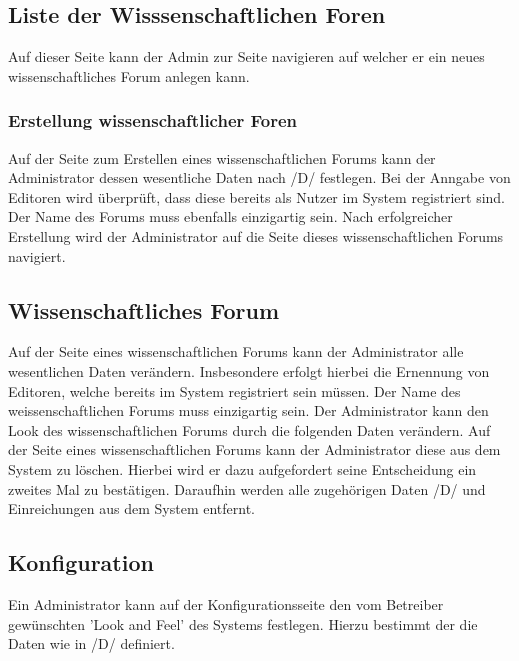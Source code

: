 \subsection{Liste der Wisssenschaftlichen Foren}
\begin{description}
     Auf dieser Seite kann der Admin zur Seite navigieren auf welcher er ein neues
    wissenschaftliches Forum anlegen kann. %
\end{description}

\subsubsection{Erstellung wissenschaftlicher Foren}
\begin{description}
     Auf der Seite zum Erstellen eines wissenschaftlichen Forums kann der Administrator dessen
    wesentliche Daten nach /D/ %
    festlegen. Bei der Anngabe von Editoren wird überprüft, dass diese bereits als Nutzer im System registriert sind.
    Der Name des Forums muss ebenfalls einzigartig sein.
    Nach erfolgreicher Erstellung wird der Administrator auf die Seite dieses wissenschaftlichen Forums
    navigiert.
\end{description}

\subsection{Wissenschaftliches Forum}
\begin{description}
     Auf der Seite eines wissenschaftlichen Forums kann der Administrator alle wesentlichen Daten
    verändern. Insbesondere erfolgt hierbei die Ernennung von Editoren, welche bereits im System
    registriert sein  müssen. Der Name des weissenschaftlichen Forums muss einzigartig sein.
     Der Administrator kann den Look des wissenschaftlichen Forums durch die folgenden Daten
    verändern. %
     Auf der Seite eines wissenschaftlichen Forums kann der Administrator diese aus dem System zu löschen.
    Hierbei wird er dazu aufgefordert seine Entscheidung ein zweites Mal zu bestätigen.
    Daraufhin werden alle zugehörigen Daten /D/ und Einreichungen aus dem System entfernt. %
\end{description}

\subsection{Konfiguration}
\begin{description}
     Ein Administrator kann auf der Konfigurationsseite den vom Betreiber gewünschten
    'Look and Feel' des Systems festlegen. Hierzu bestimmt der die Daten wie in /D/ definiert. %
\end{description}